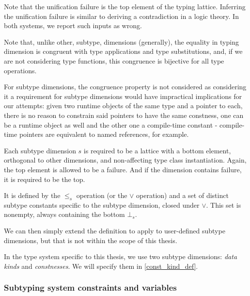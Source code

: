 \begin{remark}
    Note that the unification failure is the top element of the typing lattice. Inferring the unification failure is similar to deriving a contradiction in a logic theory. In both systems, we report such inputs as wrong.
\end{remark}

\begin{remark}
    \label{congruence}
    Note that, unlike other, subtype, dimensions (generally), the equality in typing dimension is congruent with type applications and type substitutions, and, if we are not considering type functions, this congruence is bijective for all type operations.

    For subtype dimensions, the congruence property is not considered  as considering it a requirement for subtype dimensions would have impractical implications for our attempts: given two runtime objects of the same type and a pointer to each, there is no reason to constrain said pointers to have the same constness, one can be a runtime object as well and the other one a compile-time constant - compile-time pointers are equivalent to named references, for example.
\end{remark}

\begin{defn}
    \label{st_dim}
    Each subtype dimension $s$ is required to be a lattice with a bottom element, orthogonal to other dimensions, and non-affecting type class instantiation. Again, the top element is allowed to be a failure. And if the dimension contains failure, it is required to be the top.

    It is defined by the $\leq_s$ operation (or the $\lor$ operation) and a set of distinct subtype constants specific to the subtype dimension, closed under $\lor$. This set is nonempty, always containing the bottom $\bot_s$.

    We can then simply extend the definition to apply to user-defined subtype dimensions, but that is not within the scope of this thesis.

    In the type system specific to this thesis, we use two subtype dimensions: \emph{data kinds} and \emph{constnesses}. We will specify them in \cref{const_kind_def}.
\end{defn}


\subsubsection{Subtyping system constraints and variables}

